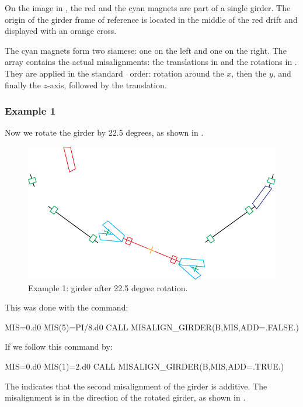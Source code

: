 On the image in , the red and the cyan magnets
are part of a single girder. The origin of the girder frame of reference is
located in the middle of the red drift and displayed with an orange cross.

%
The cyan magnets form two siamese: one on the left and one on the
right. The array  contains the actual misalignments: the translations
in  and the rotations in . They are applied in the
standard \PTC\ order: rotation around the $x$, then the $y$, and finally
the $z$-axis, followed by the translation.


\subsubsection*{Example 1}

Now we rotate the girder by 22.5 degrees, as shown in .

\begin{figure}[ht]
  \centering
  \includegraphics[width=.9\textwidth]{illustrations/misalign-fig2}
  \caption{Example 1: girder after 22.5 degree rotation.}
  \label{fig:Example-1-1}
\end{figure}

This was done with the command:

\begin{ptccode}
MIS=0.d0
MIS(5)=PI/8.d0
CALL MISALIGN_GIRDER(B,MIS,ADD=.FALSE.)
\end{ptccode}

If we follow this command by:

\begin{ptccode}
MIS=0.d0
MIS(1)=2.d0
CALL MISALIGN_GIRDER(B,MIS,ADD=.TRUE.)
\end{ptccode}

The  indicates that the second misalignment of the girder
is additive. The misalignment is in the direction of the rotated girder,
as shown in .

